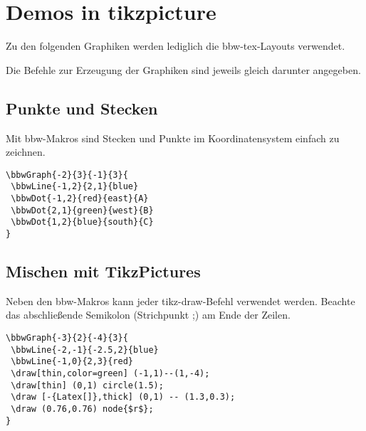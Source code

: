 


\renewcommand{\metaHeaderLine}{Einführung Trainer}
\renewcommand{\arbeitsblattTitel}{Demo Latex Beispiele zu Koordinatensystemen}

\arbeitsblattHeader{}

\section{Demos in tikzpicture}

Zu den folgenden Graphiken werden lediglich die bbw-tex-Layouts verwendet.

Die Befehle zur Erzeugung der Graphiken sind jeweils gleich darunter angegeben.

\subsection{Punkte und Stecken}
Mit bbw-Makros sind Stecken und Punkte im Koordinatensystem einfach zu zeichnen.


\begin{verbatim}
\bbwGraph{-2}{3}{-1}{3}{
 \bbwLine{-1,2}{2,1}{blue}
 \bbwDot{-1,2}{red}{east}{A}
 \bbwDot{2,1}{green}{west}{B}
 \bbwDot{1,2}{blue}{south}{C}
}
\end{verbatim}


\newpage
\subsection{Mischen mit TikzPictures}
Neben den bbw-Makros kann jeder tikz-draw-Befehl verwendet werden. Beachte das abschließende Semikolon (Strichpunkt ;) am Ende der Zeilen.

\begin{verbatim}
\bbwGraph{-3}{2}{-4}{3}{
 \bbwLine{-2,-1}{-2.5,2}{blue}
 \bbwLine{-1,0}{2,3}{red}
 \draw[thin,color=green] (-1,1)--(1,-4);
 \draw[thin] (0,1) circle(1.5);
 \draw [-{Latex[]},thick] (0,1) -- (1.3,0.3);
 \draw (0.76,0.76) node{$r$};
}
\end{verbatim}
\newpage

